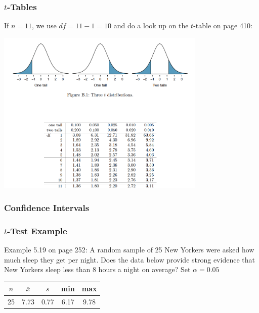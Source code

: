 \documentclass[handout]{beamer}
\newcommand{\xbar}{\overline{x}}
\begin{document}
\begin{frame}
\frametitle{$t$-Tables}
If $n=11$, we use $df=11-1=10$ and do a look up on the $t$-table on page 410:

\begin{center}
\includegraphics[width=0.75\textwidth]{figure/t.png}
\end{center}

\end{frame}


\begin{frame}
\frametitle{Confidence Intervals}

%

\end{frame}


\begin{frame}
\frametitle{$t$-Test Example}

Example 5.19 on page 252:  A random sample of 25 New Yorkers were asked how much sleep they get per night. Does the data below provide strong evidence that New Yorkers sleep less than 8 hours a night on average?  Set $\alpha=0.05$

\vspace{0.5cm}
\begin{center}
\begin{tabular}{c|c|c|c|c}
$n$ & $\xbar$ & $s$ & min & max\\
\hline
25 & 7.73 & 0.77 & 6.17 & 9.78\\
\end{tabular}
\end{center}

\end{frame}
\end{document}
